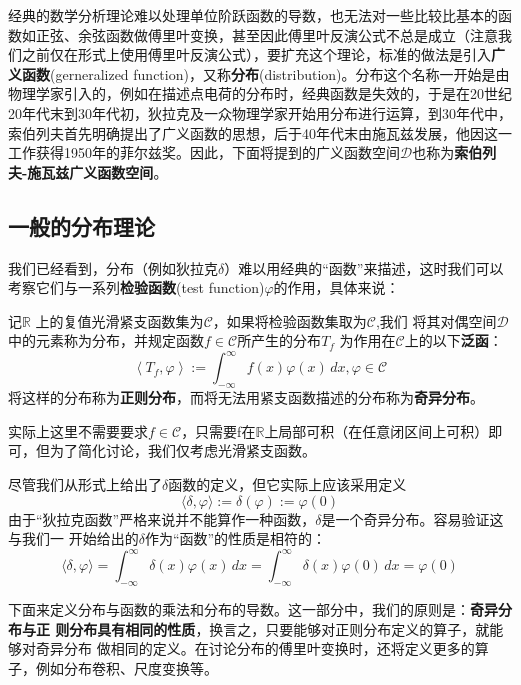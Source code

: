 \documentclass{ctexbook}
\begin{document}
经典的数学分析理论难以处理单位阶跃函数的导数，也无法对一些比较比基本的函数如正弦、余弦函数做傅里叶变换，甚至因此傅里叶反演公式不总是成立（注意我们之前仅在形式上使用傅里叶反演公式），要扩充这个理论，标准的做法是引入\textbf{广义函数}(gerneralized function)，又称\textbf{分布}(distribution)。分布这个名称一开始是由物理学家引入的，例如在描述点电荷的分布时，经典函数是失效的，于是在20世纪20年代末到30年代初，狄拉克及一众物理学家开始用分布进行运算，到30年代中，索伯列夫首先明确提出了广义函数的思想，后于40年代末由施瓦兹发展，他因这一工作获得1950年的菲尔兹奖。因此，下面将提到的广义函数空间$\mathcal{D} $也称为\textbf{索伯列夫-施瓦兹广义函数空间}\cite{zorich}。

\subsection{一般的分布理论}\label{sub:general_distributions}

我们已经看到，分布（例如狄拉克$\delta$）难以用经典的“函数”来描述，这时我们可以
考察它们与一系列\textbf{检验函数}(test function)$\varphi$的作用，具体来说：
\begin{definition}[分布]
记$\mathbb{R}$
上的复值光滑紧支函数集为$\mathcal{C} $，如果将检验函数集取为$\mathcal{C}$,我们
将其对偶空间$\mathcal{D} $中的元素称为分布，并规定函数$f\in \mathcal{C} $所产生的分布$T_f$
为作用在$\mathcal{C}$上的以下\textbf{泛函}：
\begin{equation*}
    \left\langle T_f,\varphi\right\rangle:=\int_{-\infty}^{\infty}f(x)\varphi(x)\,dx,\varphi\in\mathcal{C}
\end{equation*}
将这样的分布称为\textbf{正则分布}，而将无法用紧支函数描述的分布称为\textbf{奇异分布}。
\end{definition}
\begin{remark}
   实际上这里不需要要求$f\in\mathcal{C} $，只需要f在$\mathbb{R}$上局部可积（在任意闭区间上可积）即可，但为了简化讨论，我们仅考虑光滑紧支函数。 
\end{remark}
\begin{example}
    尽管我们从形式上给出了$\delta$函数的定义，但它实际上应该采用定义
\[\langle \delta,\varphi\rangle:=\delta(\varphi):=\varphi(0)\]
由于“狄拉克函数”严格来说并不能算作一种函数，$\delta$是一个奇异分布。容易验证这与我们一
开始给出的$\delta$作为“函数”的性质是相符的：
\[\langle \delta,\varphi\rangle=\int_{-\infty}^{\infty}\delta(x)\varphi(x)\,dx=\int_{-\infty}^{\infty}\delta(x)\varphi(0)\,dx=\varphi(0)\]
\end{example}

下面来定义分布与函数的乘法和分布的导数。这一部分中，我们的原则是：\textbf{奇异分布与正
    则分布具有相同的性质}，换言之，只要能够对正则分布定义的算子，就能够对奇异分布
做相同的定义。在讨论分布的傅里叶变换时，还将定义更多的算子，例如分布卷积、尺度变换等。
\end{document}
